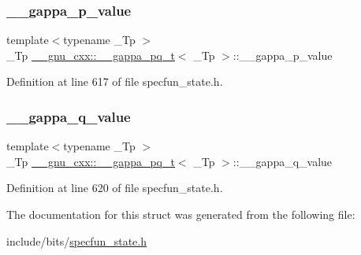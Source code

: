 \subsubsection{\texorpdfstring{\+\_\+\+\_\+gappa\+\_\+p\+\_\+value}{\_\_gappa\_p\_value}}
{\footnotesize\ttfamily template$<$typename \+\_\+\+Tp $>$ \\
\+\_\+\+Tp \hyperlink{struct____gnu__cxx_1_1____gappa__pq__t}{\+\_\+\+\_\+gnu\+\_\+cxx\+::\+\_\+\+\_\+gappa\+\_\+pq\+\_\+t}$<$ \+\_\+\+Tp $>$\+::\+\_\+\+\_\+gappa\+\_\+p\+\_\+value}



Definition at line 617 of file specfun\+\_\+state.\+h.

\mbox{\label{struct____gnu__cxx_1_1____gappa__pq__t_afd7d83a4e618ca4b710c952638951714}} 
\subsubsection{\texorpdfstring{\+\_\+\+\_\+gappa\+\_\+q\+\_\+value}{\_\_gappa\_q\_value}}
{\footnotesize\ttfamily template$<$typename \+\_\+\+Tp $>$ \\
\+\_\+\+Tp \hyperlink{struct____gnu__cxx_1_1____gappa__pq__t}{\+\_\+\+\_\+gnu\+\_\+cxx\+::\+\_\+\+\_\+gappa\+\_\+pq\+\_\+t}$<$ \+\_\+\+Tp $>$\+::\+\_\+\+\_\+gappa\+\_\+q\+\_\+value}



Definition at line 620 of file specfun\+\_\+state.\+h.



The documentation for this struct was generated from the following file\+:\begin{DoxyCompactItemize}
\item 
include/bits/\hyperlink{specfun__state_8h}{specfun\+\_\+state.\+h}\end{DoxyCompactItemize}
